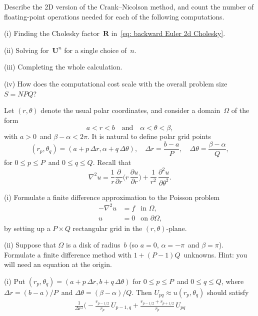 \begin{Exercises}
\exercise
Describe the 2D version of the Crank--Nicolson method, and count the number of 
floating-point operations needed for each of the following computations.
\begin{description}
\item{(i)} Finding the Cholesky factor~$\boldsymbol{R}$ 
in~\eqref{eq: backward Euler 2d Cholesky}.
\item{(ii)} Solving for~$\boldsymbol{U}^n$ for a single choice of~$n$.
\item{(iii)} Completing the whole calculation.
\item{(iv)} How does the computational cost scale with the overall problem 
size~$S=NPQ$?
\end{description}

\exercise
Let $(r,\theta)$ denote the usual polar coordinates, and consider a
domain~$\Omega$ of the form
\[
a<r<b 
\quad\text{and}\quad 
\alpha<\theta<\beta,
\]
with $a>0$~and $\beta-\alpha<2\pi$. It is natural to define polar
grid points
\[
(r_p,\theta_q)=(a+p\,\Delta r, \alpha+q\,\Delta\theta),\quad
\Delta r=\frac{b-a}{P},\quad
\Delta\theta=\frac{\beta-\alpha}{Q},
\]
for $0\le p\le P$~and $0\le q\le Q$.  Recall that
\[
\nabla^2u=\frac{1}{r}\frac{\partial}{\partial r}
        \biggl(r\,\frac{\partial u}{\partial r}\biggr)
        +\frac{1}{r^2}\,\frac{\partial^2u}{\partial\theta^2}.
\]
\begin{description}
\item{(i)} Formulate a finite difference approximation to the Poisson problem
\[
\begin{aligned}
-\nabla^2u&=f&\text{in $\Omega$,}\\
u&=0&\text{on $\partial\Omega$,}
\end{aligned}
\]
by setting up a $P\times Q$ rectangular grid in the
$(r,\theta)$-plane.
\item{(ii)}
Suppose that $\Omega$ is a disk of radius~$b$ (so $a=0$,
$\alpha=-\pi$~and $\beta=\pi$).  Formulate a finite difference
method with $1+(P-1)Q$~unknowns.  Hint: you will need an equation
at the origin.
\end{description}
\begin{ans}
(i)
Put $(r_p,\theta_q)=(a+p\,\Delta r,b+q\,\Delta\theta)$
for $0\le p\le P$~and $0\le q\le Q$, where $\Delta r=(b-a)/P$~and
$\Delta\theta=(\beta-\alpha)/Q$.  Then $U_{pq}\approx u(r_p,\theta_q)$
should satisfy
\begin{multline*}
\frac{1}{\Delta r^2}\biggl(
        -\frac{r_{p-1/2}}{r_p}\,U_{p-1,q}
        +\frac{r_{p-1/2}+r_{p+1/2}}{r_p}\,U_{pq}

\end{multline*}
\end{ans}
\end{Exercises}
